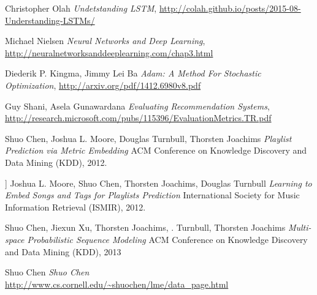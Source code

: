 \documentclass{article} %
\begin{document}
\newpage

\begin{thebibliography}{9}

  Christopher Olah
  \emph{Undetstanding LSTM},
\url{http://colah.github.io/posts/2015-08-Understanding-LSTMs/}

  Michael Nielsen
  \emph{Neural Networks and Deep Learning},
\url{http://neuralnetworksanddeeplearning.com/chap3.html}

  Diederik P. Kingma, Jimmy Lei Ba
  \emph{Adam: A Method For Stochastic Optimization},
\url{http://arxiv.org/pdf/1412.6980v8.pdf}

  Guy Shani, Asela Gunawardana
  \emph{Evaluating Recommendation Systems},
\url{http://research.microsoft.com/pubs/115396/EvaluationMetrics.TR.pdf}

  Shuo Chen, Joshua L. Moore, Douglas Turnbull, Thorsten Joachims  \emph{ Playlist Prediction via Metric Embedding} ACM Conference on Knowledge Discovery and Data Mining (KDD), 2012.


  ] Joshua L. Moore, Shuo Chen, Thorsten Joachims, Douglas Turnbull\emph{ Learning to Embed Songs and Tags for Playlists Prediction} International Society for Music Information Retrieval (ISMIR), 2012.


  Shuo Chen, Jiexun Xu, Thorsten Joachims, . Turnbull, Thorsten Joachims  \emph{ Multi-space Probabilistic Sequence Modeling} ACM Conference on Knowledge Discovery and Data Mining (KDD), 2013


  Shuo Chen \emph{ Shuo Chen} 
  \url{http://www.cs.cornell.edu/~shuochen/lme/data_page.html}
\end{thebibliography}
\end{document}
